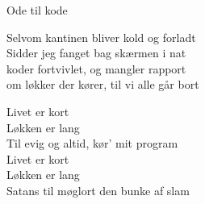 \begin{song}{Ode til kode}
  \begin{SBVerse}
    Selvom kantinen bliver kold og forladt \\
    Sidder jeg fanget bag skærmen i nat \\
    koder fortvivlet, og mangler rapport \\
    om løkker der kører, til vi alle går bort \\
  \end{SBVerse}

  \begin{SBChorus}
    Livet er kort \\
    Løkken er lang \\
    Til evig og altid, kør' mit program \\
    
    Livet er kort \\
    Løkken er lang \\
    Satans til møglort den bunke af slam \\
  \end{SBChorus}
\end{song}